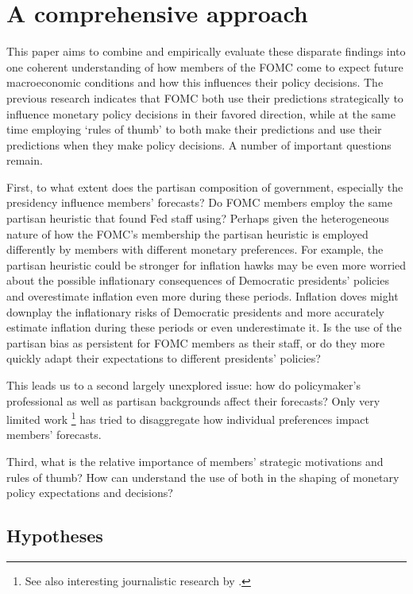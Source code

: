 \documentclass[a4paper]{article}\usepackage{graphicx, color}
\begin{document}
\section{A comprehensive approach} 

This paper aims to combine and empirically evaluate these disparate findings into one coherent understanding of how members of the FOMC come to expect future macroeconomic conditions and how this influences their policy decisions. The previous research indicates that FOMC both use their predictions strategically to influence monetary policy decisions in their favored direction, while at the same time employing `rules of thumb' to both make their predictions and use their predictions when they make policy decisions. A number of important questions remain. 

First, to what extent does the partisan composition of government, especially the presidency influence members' forecasts? Do FOMC members employ the same partisan heuristic that \cite{gandrud2013does} found Fed staff using? Perhaps given the heterogeneous nature of how the FOMC's membership the partisan heuristic is employed differently by members with different monetary preferences. For example, the partisan heuristic could be stronger for inflation hawks may be even more worried about the possible inflationary consequences of Democratic presidents' policies and overestimate inflation even more during these periods. Inflation doves might downplay the inflationary risks of Democratic presidents and more accurately estimate inflation during these periods or even underestimate it. Is the use of the partisan bias as persistent for FOMC members as their staff, or do they more quickly adapt their expectations to different presidents' policies?

This leads us to a second largely unexplored issue: how do policymaker's professional as well as partisan backgrounds affect their forecasts? Only very limited work \citep[see][]{Tillmann2011}\footnote{See also interesting journalistic research by \cite{Hilsenrath2013}.} has tried to disaggregate how individual preferences impact members' forecasts.

Third, what is the relative importance of members' strategic motivations and rules of thumb? How can understand the use of both in the shaping of monetary policy expectations and decisions?  

\subsection{Hypotheses}
\end{document}
